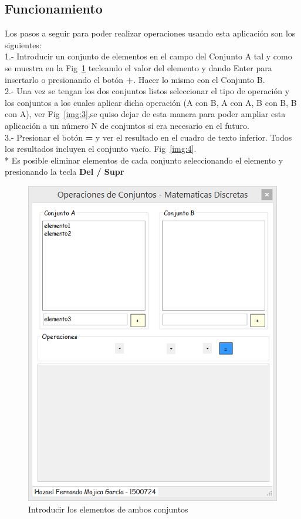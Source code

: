 \subsection{Funcionamiento}

Los pasos a seguir para poder realizar operaciones usando esta aplicación son los siguientes:\\

1.- Introducir un conjunto de elementos en el campo del Conjunto A tal y como se muestra en la Fig~\ref{img:2} tecleando el valor del elemento y dando Enter para insertarlo o presionando el botón \textbf{+}. Hacer lo mismo con el Conjunto B.\\

2.- Una vez se tengan los dos conjuntos listos seleccionar el tipo de operación y los conjuntos a los cuales aplicar dicha operación (A con B, A con A, B con B, B con A), ver Fig~\ref{img:3},se quiso dejar de esta manera para poder ampliar esta aplicación a un número N de conjuntos si era necesario en el futuro.\\

3.- Presionar el botón \textbf{=} y ver el resultado en el cuadro de texto inferior. Todos los resultados incluyen el conjunto vacío. Fig~\ref{img:4}.\\

* Es posible eliminar elementos de cada conjunto seleccionando el elemento y presionando la tecla \textbf{Del / Supr}

\begin{figure}[h]
\centering
    \includegraphics[angle = 0]{img/2.png}
    \caption{Introducir los elementos de ambos conjuntos}
	\label{img:2}
\end{figure}

